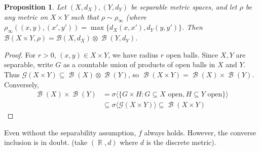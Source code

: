 \documentclass[12pt, a4paper]{memoir}
\DeclareMathOperator{\R}{{\mathbb{R}}}
\newtheorem{proposition}[theorem]{Proposition}
\theoremstyle{nonumberplain}
\newtheorem{proof}{Proof}
\DeclareMathOperator{\B}{\mathcal{B}}
\begin{document}
\begin{proposition}
    Let $(X,d_X),(Y,d_Y)$ be separable metric spaces, and let $\rho$ be any metric on $X\times Y$ such that $\rho\sim\rho_{\infty}$ (where $\rho_\infty((x,y),(x',y'))=\max\{d_X(x,x'),d_Y(y,y')\}$.
    Then $\mathcal{B}(X\times Y,\rho)=\mathcal{B}(X,d_X)\otimes\B(Y,d_Y)$.
\end{proposition}
\begin{proof}
    For $r>0$, $(x,y)\in X\times Y$, we have radius $r$ open balls.
    Since $X,Y$ are separable, write $G$ as a countable union of products of open balls in $X$ and $Y$.
    Thus $\mathcal{G}(X\times Y)\subseteq\B(X)\otimes\B(Y)$, so $\B(X\times Y)=\B(X)\times\B(Y)$.
    Conversely,
    \begin{align*}
        \B(X)\times\B(Y)&=\sigma\langle\{G\times H:G\subseteq X\text{ open},H\subseteq Y\text{ open}\}\rangle\\
                        &\subseteq\sigma\langle\mathcal{G}(X\times Y)\rangle\subseteq\B(X\times Y)
    \end{align*}
\end{proof}
Even without the separability assumption, $f$ always holds.
However, the converse inclusion is in doubt. (take $(\R,d)$ where $d$ is the discrete metric).
\end{document}
